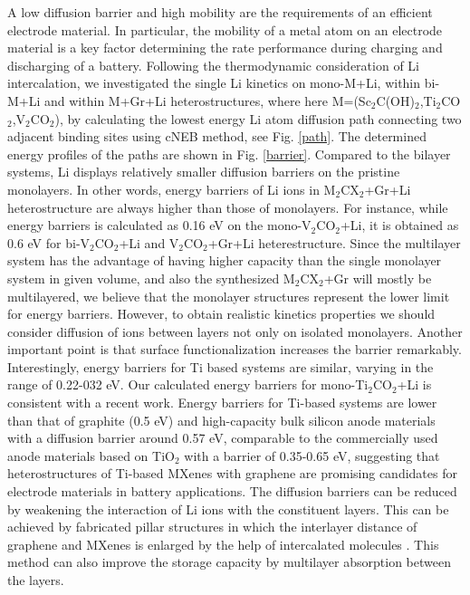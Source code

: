 A low diffusion barrier and high mobility are the requirements of an efficient electrode material. In particular, the mobility of a metal atom on an electrode material is a key factor determining the rate performance during charging and discharging of a battery. Following the thermodynamic consideration of Li intercalation, we investigated the single Li kinetics on mono-M+Li, within bi-M+Li and within M+Gr+Li heterostructures, where here M=(Sc$_2$C(OH)$_2$,Ti$_2$CO$_2$,V$_2$CO$_2$), by calculating the lowest energy Li atom diffusion path connecting two adjacent binding sites using cNEB method, see Fig. \ref{path}. The determined energy profiles of the paths are shown in Fig. \ref{barrier}. 
Compared to the bilayer systems, Li displays relatively smaller diffusion barriers on the pristine monolayers. In other words, energy barriers of Li ions in M$_2$CX$_2$+Gr+Li heterostructure are always higher than those of monolayers. For instance, while energy barriers is calculated as 0.16 eV on the mono-V$_2$CO$_2$+Li, it is obtained as 0.6 eV for bi-V$_2$CO$_2$+Li and V$_2$CO$_2$+Gr+Li heterestructure. Since the multilayer system has the advantage of having higher capacity than the single monolayer system in given volume, and also the synthesized M$_2$CX$_2$+Gr will mostly be multilayered, we believe that the monolayer structures represent the lower limit for energy barriers. However, to obtain realistic kinetics properties we should consider diffusion of ions between layers not only on isolated monolayers. Another important point is that surface functionalization increases the barrier remarkably\cite{doi:10.1021/jp504493a}. Interestingly, energy barriers for Ti based systems are similar, varying in the range of 0.22-032 eV.  Our calculated energy barriers for mono-Ti$_2$CO$_2$+Li is consistent with a recent work\cite{doi:10.1021/jp504493a}. Energy barriers for Ti-based systems are lower than that of graphite (0.5 eV)\cite{Thinius2014} and high-capacity bulk silicon anode materials with a diffusion barrier around 0.57 eV, comparable to the commercially used anode materials based on TiO$_2$ with a barrier of 0.35-0.65 eV\cite{tio2-barrier,tio2-barrier-4,tio2-barrier-3}, suggesting that heterostructures of Ti-based MXenes with graphene are promising candidates for electrode materials in battery applications. The diffusion barriers can be reduced by weakening the interaction of Li ions with the constituent layers. This can be achieved by fabricated pillar structures in which the interlayer distance of graphene and MXenes is enlarged by the help of intercalated molecules \cite{Luo2017}. This method can also improve the storage capacity by multilayer absorption between the layers. 



